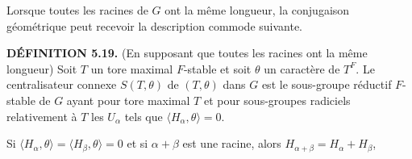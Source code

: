 \documentclass[9pt,twoside]{extarticle}
\begin{document}
{Lorsque toutes les racines de \(G\) ont la même longueur, la conjugaison géométrique peut recevoir la description commode suivante.\par

\noindent\textbf{DÉFINITION 5.19.} (En supposant que toutes les racines ont la même longueur) Soit \(T\) un tore maximal \(F\)-stable et soit \(\theta\) un caractère de \(T^F\). Le centralisateur connexe \(S(T,\theta)\) de \((T,\theta)\) dans \(G\) est le sous-groupe réductif \(F\)-stable de \(G\) ayant pour tore maximal \(T\) et pour sous-groupes radiciels relativement à \(T\) les \(U_\alpha\) tels que \(\langle H_\alpha,\theta\rangle=0\).\par

Si \(\langle H_\alpha,\theta\rangle=\langle H_\beta,\theta\rangle=0\) et si \(\alpha+\beta\) est une racine, alors \(H_{\alpha+\beta}=H_\alpha+H_\beta\),\par
}
\end{document}
